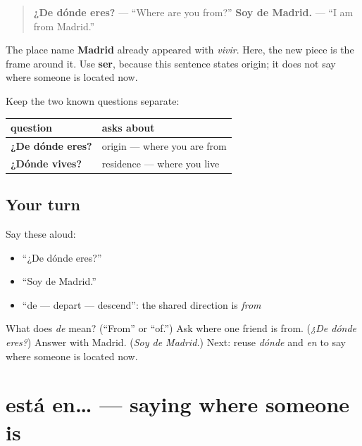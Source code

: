 \begin{grammarlens}[title={Grammar Lens: ser + de for origin}]
\begin{quote}
\textbf{¿De dónde eres?} — “Where are you from?” \textbf{Soy de Madrid.} — “I am from Madrid.”
\end{quote}

The place name \textbf{Madrid} already appeared with \emph{vivir}. Here, the new piece is the frame around it. Use \textbf{ser}, because this sentence states origin; it does not say where someone is located now.

Keep the two known questions separate:

\noindent
\begin{tabularx}{\linewidth}{@{}>{\raggedright\arraybackslash}X>{\raggedright\arraybackslash}X@{}}
\toprule
\textbf{question} & \textbf{asks about} \\
\midrule
\textbf{¿De dónde eres?} & origin — where you are from \\
\textbf{¿Dónde vives?} & residence — where you live \\
\bottomrule
\end{tabularx}
\end{grammarlens}

\subsection*{Your turn}
Say these aloud:

\begin{itemize}
\raggedright
  \item “¿De dónde eres?”
  \item “Soy de Madrid.”
  \item “de — depart — descend”: the shared direction is \emph{from}
\end{itemize}

\begin{tcolorbox}[breakable,colback=teal!4,colframe=teal!35!black,title={Before you move on}]
What does \emph{de} mean? (“From” or “of.”) Ask where one friend is from. (\emph{¿De dónde eres?}) Answer with Madrid. (\emph{Soy de Madrid.}) Next: reuse \emph{dónde} and \emph{en} to say where someone is located now.
\end{tcolorbox}
\section[está en…]{está en… — saying where someone is}

\label{lesson:ES-C09-esta-en}



